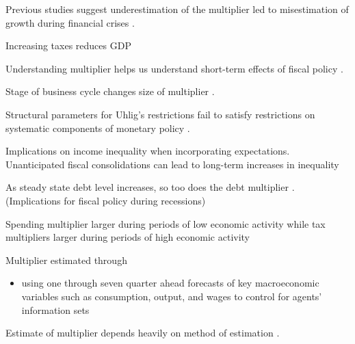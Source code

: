 
Previous studies suggest underestimation of the multiplier led to misestimation of growth during financial crises \parencite{blanchard2013growth}.  

Increasing taxes reduces GDP \parencite{barro2011macroeconomic}

Understanding multiplier helps us understand short-term effects of fiscal policy \parencite{eyraud2013challenge}.

Stage of business cycle changes size of multiplier \parencite{baum2012fiscal}.


Structural parameters for Uhlig's restrictions fail to satisfy restrictions on systematic components of monetary policy \parencite{arias2019systematic}.

Implications on income inequality when incorporating expectations.  Unanticipated fiscal consolidations can lead to long-term increases in inequality \parencite{furceri2022distributional}

As steady state debt level increases, so too does the debt multiplier \parencite{albonico2021public}.  (Implications for fiscal policy during recessions)

Spending multiplier larger during periods of low economic activity while tax multipliers larger during periods of high economic activity \parencite{arin2015fiscal}


Multiplier estimated through
\begin{itemize}
    \item using one through seven quarter ahead forecasts of key macroeconomic variables such as consumption, output, and wages to control for agents' information sets \parencite{hall2023economic}
\end{itemize}


Estimate of multiplier depends heavily on method of estimation \parencite{gechert2012fiscal}.


